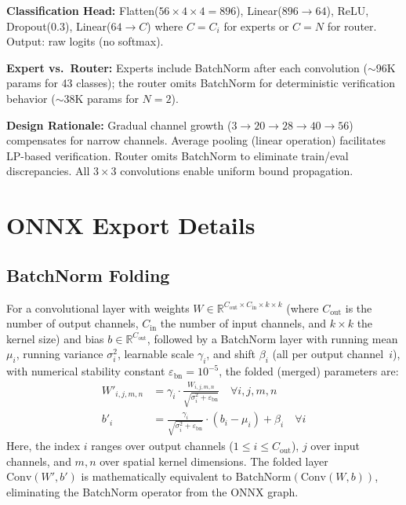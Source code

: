 \documentclass[runningheads]{llncs}
\begin{document}
\textbf{Classification Head:} Flatten($56 \times 4 \times 4 = 896$), Linear($896 \to 64$), ReLU, Dropout($0.3$), Linear($64 \to C$) where $C = C_i$ for experts or $C = N$ for router. Output: raw logits (no softmax).

\textbf{Expert vs.\ Router:} Experts include BatchNorm after each convolution (${\sim}$96K params for 43 classes); the router omits BatchNorm for deterministic verification behavior (${\sim}$38K params for $N{=}2$).

\textbf{Design Rationale:} Gradual channel growth ($3 \to 20 \to 28 \to 40 \to 56$) compensates for narrow channels. Average pooling (linear operation) facilitates LP-based verification. Router omits BatchNorm to eliminate train/eval discrepancies. All $3 \times 3$ convolutions enable uniform bound propagation.

\section{ONNX Export Details}
\label{app:onnx}

\subsection{BatchNorm Folding}

For a convolutional layer with weights $W \in \mathbb{R}^{C_{\text{out}} \times C_{\text{in}} \times k \times k}$ (where $C_{\text{out}}$ is the number of output channels, $C_{\text{in}}$ the number of input channels, and $k \times k$ the kernel size) and bias $b \in \mathbb{R}^{C_{\text{out}}}$, followed by a BatchNorm layer with running mean $\mu_i$, running variance $\sigma^2_i$, learnable scale $\gamma_i$, and shift $\beta_i$ (all per output channel~$i$), with numerical stability constant $\varepsilon_{\text{bn}} = 10^{-5}$, the folded (merged) parameters are:
\begin{align}
W'_{i,j,m,n} &= \gamma_i \cdot \frac{W_{i,j,m,n}}{\sqrt{\sigma^2_i + \varepsilon_{\text{bn}}}} \quad \forall i,j,m,n \\
b'_i &= \frac{\gamma_i}{\sqrt{\sigma^2_i + \varepsilon_{\text{bn}}}} \cdot (b_i - \mu_i) + \beta_i \quad \forall i
\end{align}
Here, the index $i$ ranges over output channels ($1 \leq i \leq C_{\text{out}}$), $j$ over input channels, and $m, n$ over spatial kernel dimensions. The folded layer $\text{Conv}(W', b')$ is mathematically equivalent to $\text{BatchNorm}(\text{Conv}(W, b))$, eliminating the BatchNorm operator from the ONNX graph.
\end{document}
